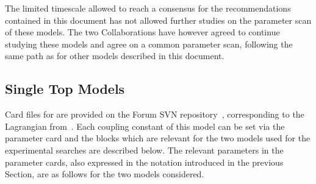 
The limited timescale allowed to reach a consensus for
the recommendations contained in this document has not allowed further studies on the 
parameter scan of these models. The two Collaborations have however agreed to continue studying
these models and agree on a common parameter scan,
following the same path as for other models described in this document.  

\subsection{Single Top Models}


Card files for \madgraph are provided on the Forum SVN repository~\cite{ForumSVN_EWMonoTop}, 
corresponding to the Lagrangian from~\cite{AndreaFuksMaltoni}. 
Each coupling constant of this model can be set via the parameter card and 
the blocks which are relevant for the two models used for the experimental searches are described below.
The relevant parameters in the \madgraph parameter cards, also expressed in the notation introduced in the 
previous Section, are as follows for the two models considered.

